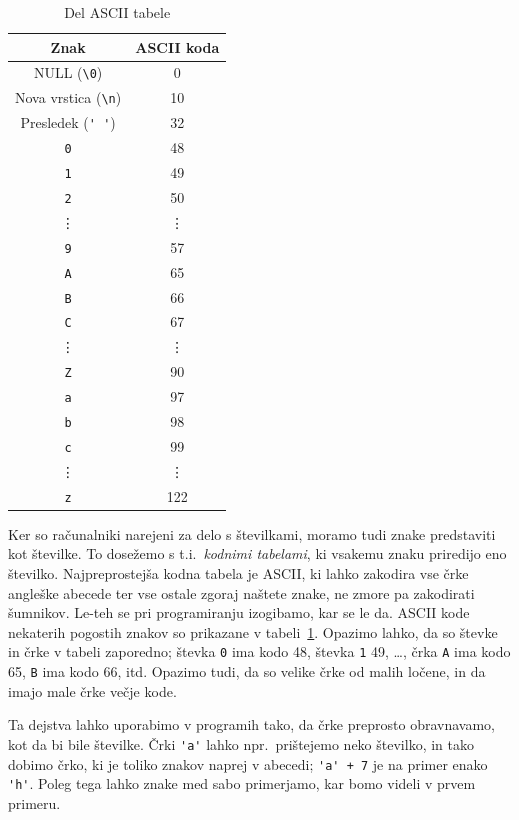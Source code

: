\documentclass{book}
\begin{document}
\begin{table}[h!]
  \centering
  \begin{tabular}[h!]{|c|c|}
	\hline
	Znak & ASCII koda \\
	\hline
	NULL (\verb+\0+) & 0 \\
	Nova vrstica (\verb+\n+) & 10 \\
	Presledek (\verb+' '+) & 32 \\
	\hline
	\verb+0+ & 48 \\
	\verb+1+ & 49 \\
	\verb+2+ & 50 \\
	\vdots & \vdots \\
	\verb+9+ & 57 \\
	\hline
	\verb+A+ & 65 \\
	\verb+B+ & 66 \\
	\verb+C+ & 67 \\
	\vdots & \vdots \\
	\verb+Z+ & 90 \\
	\hline
	\verb+a+ & 97 \\
	\verb+b+ & 98 \\
	\verb+c+ & 99 \\
	\vdots & \vdots \\
	\verb+z+ & 122 \\
	\hline
  \end{tabular}
  \caption{Del ASCII tabele}
  \label{tab:ascii}
\end{table}

Ker so računalniki narejeni za delo s številkami, moramo tudi znake
predstaviti kot številke.
To dosežemo s t.i.~\textit{kodnimi tabelami}, ki vsakemu znaku priredijo eno
številko.
Najpreprostejša kodna tabela je ASCII, ki lahko zakodira vse črke angleške
abecede ter vse ostale zgoraj naštete znake, ne zmore pa zakodirati šumnikov.
Le-teh se pri programiranju izogibamo, kar se le da.
ASCII kode nekaterih pogostih znakov so prikazane v tabeli~\ref{tab:ascii}.
Opazimo lahko, da so števke in črke v tabeli zaporedno; števka \verb+0+ ima kodo
48, števka \verb+1+ 49, \ldots, črka \verb+A+ ima kodo 65, \verb+B+ ima kodo 66,
itd. 
Opazimo tudi, da so velike črke od malih ločene, in da imajo male črke večje
kode.

Ta dejstva lahko uporabimo v programih tako, da črke preprosto obravnavamo, kot
da bi bile številke.
Črki \verb+'a'+ lahko npr.~prištejemo neko številko, in tako dobimo črko, ki je
toliko znakov naprej v abecedi; \verb|'a' + 7| je na primer enako \verb|'h'|.
Poleg tega lahko znake med sabo primerjamo, kar bomo videli v prvem primeru.
\end{document}
